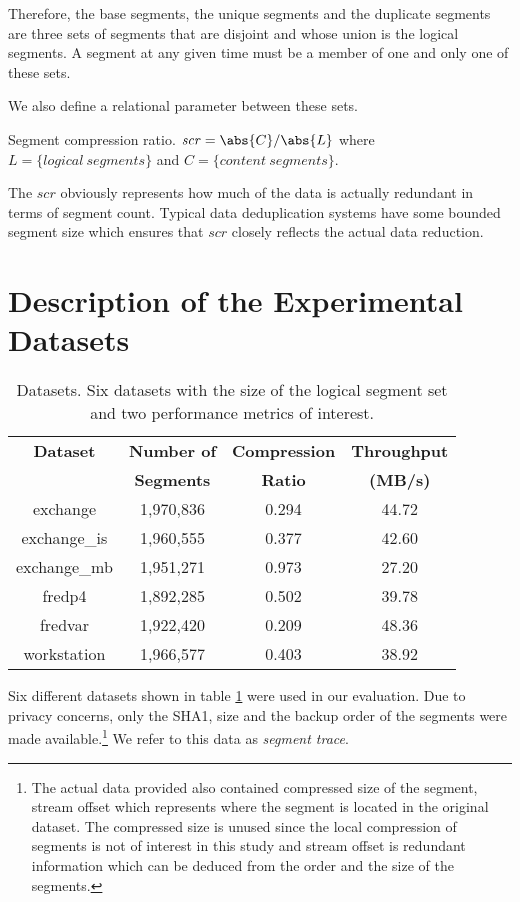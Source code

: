 Therefore, the base segments, the unique segments and the duplicate segments are three sets of segments that are disjoint and whose union is the logical segments. A segment at any given time must be a member of one and only one of these sets.

We also define a relational parameter between these sets.
\begin{definition}\label{scr}
Segment compression ratio. $\mathit{scr} = \abs{C}/\abs{L}$ where $L=\{\mathit{logical\ segments}\}$ and $C=\{\mathit{content\ segments}\}$. 
\end{definition}

The $\mathit{scr}$ obviously represents how much of the data is actually redundant in terms of segment count. Typical data deduplication systems have some bounded segment size which ensures that $\mathit{scr}$ closely reflects the actual data reduction. 

\section{Description of the Experimental Datasets}\label{dss}

\begin{table}[!t]
\renewcommand{\arraystretch}{1.3}
\caption{Datasets. Six datasets with the size of the logical segment set and two performance metrics of interest.}
\label{ds_t}
\centering
\begin{tabular}{c||c c c}
\hline
\bfseries Dataset 	&\bfseries Number of	&\bfseries Compression 	&\bfseries Throughput	\\
 			&\bfseries Segments	&\bfseries Ratio 		&\bfseries (MB/s)		\\
\hline\hline
exchange 		&1,970,836			&0.294			&44.72			\\
exchange\_is	&1,960,555			&0.377			&42.60			\\
exchange\_mb 	&1,951,271			&0.973			&27.20			\\
fredp4		&1,892,285			&0.502			&39.78			\\
fredvar		&1,922,420			&0.209			&48.36			\\
workstation		&1,966,577			&0.403			&38.92			\\
\hline
\end{tabular}
\end{table}

Six different datasets shown in table \ref{ds_t} were used in our evaluation. Due to privacy concerns, only the SHA1, size and the backup order of the segments were made available.\footnote{The actual data provided also contained compressed size of the segment, stream offset which represents where the segment is located in the original dataset. The compressed size is unused since the local compression of segments is not of interest in this study and stream offset is redundant information which can be deduced from the order and the size of the segments.} We refer to this data as \emph{segment trace}. 

